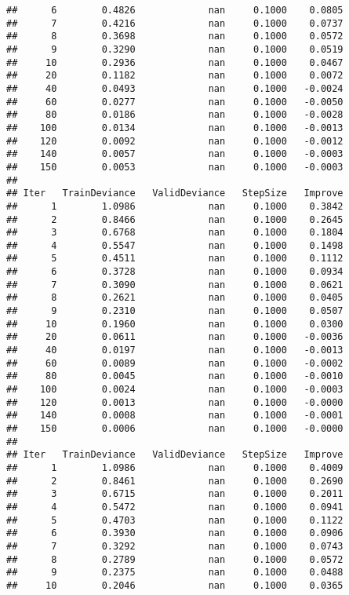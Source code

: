 \documentclass[
]{article}
\begin{document}
\begin{verbatim}
##      6        0.4826             nan     0.1000    0.0805
##      7        0.4216             nan     0.1000    0.0737
##      8        0.3698             nan     0.1000    0.0572
##      9        0.3290             nan     0.1000    0.0519
##     10        0.2936             nan     0.1000    0.0467
##     20        0.1182             nan     0.1000    0.0072
##     40        0.0493             nan     0.1000   -0.0024
##     60        0.0277             nan     0.1000   -0.0050
##     80        0.0186             nan     0.1000   -0.0028
##    100        0.0134             nan     0.1000   -0.0013
##    120        0.0092             nan     0.1000   -0.0012
##    140        0.0057             nan     0.1000   -0.0003
##    150        0.0053             nan     0.1000   -0.0003
## 
## Iter   TrainDeviance   ValidDeviance   StepSize   Improve
##      1        1.0986             nan     0.1000    0.3842
##      2        0.8466             nan     0.1000    0.2645
##      3        0.6768             nan     0.1000    0.1804
##      4        0.5547             nan     0.1000    0.1498
##      5        0.4511             nan     0.1000    0.1112
##      6        0.3728             nan     0.1000    0.0934
##      7        0.3090             nan     0.1000    0.0621
##      8        0.2621             nan     0.1000    0.0405
##      9        0.2310             nan     0.1000    0.0507
##     10        0.1960             nan     0.1000    0.0300
##     20        0.0611             nan     0.1000   -0.0036
##     40        0.0197             nan     0.1000   -0.0013
##     60        0.0089             nan     0.1000   -0.0002
##     80        0.0045             nan     0.1000   -0.0010
##    100        0.0024             nan     0.1000   -0.0003
##    120        0.0013             nan     0.1000   -0.0000
##    140        0.0008             nan     0.1000   -0.0001
##    150        0.0006             nan     0.1000   -0.0000
## 
## Iter   TrainDeviance   ValidDeviance   StepSize   Improve
##      1        1.0986             nan     0.1000    0.4009
##      2        0.8461             nan     0.1000    0.2690
##      3        0.6715             nan     0.1000    0.2011
##      4        0.5472             nan     0.1000    0.0941
##      5        0.4703             nan     0.1000    0.1122
##      6        0.3930             nan     0.1000    0.0906
##      7        0.3292             nan     0.1000    0.0743
##      8        0.2789             nan     0.1000    0.0572
##      9        0.2375             nan     0.1000    0.0488
##     10        0.2046             nan     0.1000    0.0365

\end{verbatim}
\end{document}
